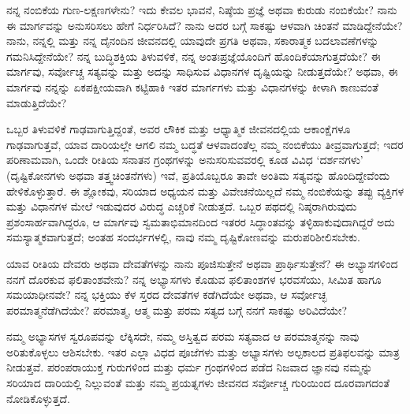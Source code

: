 \begin{mananam}{}
\nfntmtxt ನನ್ನ ನಂಬಿಕೆಯ ಗುಣ-ಲಕ್ಷಣಗಳೇನು? ಇದು ಕೇವಲ ಭಾವನೆ, ನಿಷ್ಠೆಯ ಪ್ರಜ್ಞೆ ಅಥವಾ ಕುರುಡು ನಂಬಿಕೆಯೇ?  ನಾನು ಈ ಮಾರ್ಗವನ್ನು  ಅನುಸರಿಸಲು  ಹೇಗೆ ನಿರ್ಧರಿಸಿದೆ? ನಾನು ಅದರ  ಬಗ್ಗೆ ಸಾಕಷ್ಟು ಆಳವಾಗಿ ಚಿಂತನೆ ಮಾಡಿದ್ದೇನೆಯೇ?  ನಾನು, ನನ್ನಲ್ಲಿ ಮತ್ತು ನನ್ನ ದೈನಂದಿನ ಜೀವನದಲ್ಲಿ ಯಾವುದೇ ಪ್ರಗತಿ ಅಥವಾ, ಸಕಾರಾತ್ಮಕ ಬದಲಾವಣೆಗಳನ್ನು ಗಮನಿಸಿದ್ದೇನೆಯೇ? ನನ್ನ ಬುದ್ಧಿಶಕ್ತಿಯ ತಿಳುವಳಿಕೆ, ನನ್ನ ಅಂತಃಪ್ರಜ್ಞೆಯೊಂದಿಗೆ ಹೊಂದಿಕೆಯಾಗುತ್ತದೆಯೇ? ಈ ಮಾರ್ಗವು, ಸರ್ವೋಚ್ಚ ಸತ್ಯವನ್ನು ಮತ್ತು ಅದನ್ನು ಸಾಧಿಸುವ ವಿಧಾನಗಳ ದೃಷ್ಟಿಯನ್ನು ನೀಡುತ್ತದೆಯೇ? ಅಥವಾ, ಈ ಮಾರ್ಗವು ನನ್ನನ್ನು ಏಕಪಕ್ಷೀಯವಾಗಿ ಕಟ್ಟಿಹಾಕಿ ಇತರ ಮಾರ್ಗಗಳು ಮತ್ತು ವಿಧಾನಗಳನ್ನು ಕೀಳಾಗಿ ಕಾಣುವಂತೆ ಮಾಡುತ್ತಿದೆಯೇ?
\end{mananam}
\sReflect
\begin{inspiration}{}
\nfntmtxt ಒಬ್ಬರ ತಿಳುವಳಿಕೆ ಗಾಢವಾಗುತ್ತಿದ್ದಂತೆ, ಅವರ ಲೌಕಿಕ ಮತ್ತು ಆಧ್ಯಾತ್ಮಿಕ ಜೀವನದಲ್ಲಿಯ ಆಕಾಂಕ್ಷೆಗಳೂ ಗಾಢವಾಗುತ್ತವೆ, ಯಾವ ದಾರಿಯಲ್ಲೇ  ಆಗಲಿ ನಮ್ಮ ಬದ್ಧತೆ ಆಳವಾದಂತೆಲ್ಲ ನಮ್ಮ ನಂಬಿಕೆಯು ತೀವ್ರವಾಗುತ್ತದೆ; ಇದರ ಪರಿಣಾಮವಾಗಿ, ಒಂದೇ ರೀತಿಯ ಸನಾತನ ಗ್ರಂಥಗಳನ್ನು ಅನುಸರಿಸುವವರಲ್ಲಿ ಕೂಡ  ವಿವಿಧ ‘ದರ್ಶನಗಳು’ (ದೃಷ್ಟಿಕೋನಗಳು ಅಥವಾ ತತ್ತ್ವಚಿಂತನೆಗಳು) ಇವೆ, ಪ್ರತಿಯೊಬ್ಬರೂ ತಾವೇ ಅಂತಿಮ ಸತ್ಯವನ್ನು ಹೊಂದಿದ್ದೇವೆಂದು  ಹೇಳಿಕೊಳ್ಳುತ್ತಾರೆ. ಈ ಶ್ಲೋಕವು, ಸರಿಯಾದ ಅಧ್ಯಯನ ಮತ್ತು ವಿವೇಚನೆಯಿಲ್ಲದೆ ನಮ್ಮ ನಂಬಿಕೆಯನ್ನು ತಪ್ಪು ವ್ಯಕ್ತಿಗಳ ಮತ್ತು ವಿಧಾನಗಳ ಮೇಲೆ ಇಡುವುದರ ವಿರುದ್ಧ ಎಚ್ಚರಿಕೆ ನೀಡುತ್ತದೆ. ಒಬ್ಬರ ಪಥದಲ್ಲಿ ನಿಷ್ಠರಾಗಿರುವುದು ಪ್ರಶಂಸಾರ್ಹವಾಗಿದ್ದರೂ, ಆ ಮಾರ್ಗವು ಸ್ವಮತಾಭಿಮಾನದಿಂದ ಇತರರ ಸಿದ್ಧಾಂತವನ್ನು ತಳ್ಳಿಹಾಕುವುದಾಗಿದ್ದರೆ ಅದು ಸಮಸ್ಯಾತ್ಮಕವಾಗುತ್ತದೆ; ಅಂತಹ ಸಂದರ್ಭಗಳಲ್ಲಿ, ನಾವು ನಮ್ಮ ದೃಷ್ಟಿಕೋಣವನ್ನು ಮರುಪರಿಶೀಲಿಸಬೇಕು.
\end{inspiration}
\newpage

\begin{mananam}{}
\nfntmtxt ಯಾವ ರೀತಿಯ ದೇವರು ಅಥವಾ ದೇವತೆಗಳನ್ನು ನಾನು ಪೂಜಿಸುತ್ತೇನೆ ಅಥವಾ ಪ್ರಾರ್ಥಿಸುತ್ತೇನೆ? ಈ ಅಭ್ಯಾಸಗಳಿಂದ ನನಗೆ ದೊರಕುವ ಫಲಿತಾಂಶವೇನು? ನನ್ನ ಅಭ್ಯಾಸಗಳು ಕೊಡುವ ಫಲಿತಾಂಶಗಳ ಭರವಸೆಯು, ಸೀಮಿತ ಹಾಗೂ ಸಮಯಾಧೀನವೇ? ನನ್ನ ಭಕ್ತಿಯು ಕೆಳ ಸ್ತರದ ದೇವತೆಗಳ ಕಡೆಗಿದೆಯೇ ಅಥವಾ, ಆ ಸರ್ವೋಚ್ಛ ಪರಮಾತ್ಮನೆಡೆಗಿದೆಯೇ? ಪರಮಾತ್ಮ, ಆತ್ಮ ಮತ್ತು ಪರಮ ಸತ್ಯದ ಬಗ್ಗೆ ನನಗೆ ಸಾಕಷ್ಟು ಅರಿವಿದೆಯೇ?
\end{mananam}
\sReflect
\begin{inspiration}{}
\nfntmtxt ನಮ್ಮ ಅಭ್ಯಾಸಗಳ ಸ್ವರೂಪವನ್ನು ಲೆಕ್ಕಿಸದೇ, ನಮ್ಮ ಅಸ್ತಿತ್ವದ ಪರಮ ಸತ್ಯವಾದ ಆ ಪರಮಾತ್ಮನನ್ನು ನಾವು  ಅರಿತುಕೊಳ್ಳಲು ಆಶಿಸಬೇಕು. ಇತರ ಎಲ್ಲಾ ವಿಧದ ಪೂಜೆಗಳು ಮತ್ತು ಅಭ್ಯಾಸಗಳು ಅಲ್ಪಕಾಲದ ಪ್ರತಿಫಲವನ್ನು ಮಾತ್ರ ನೀಡುತ್ತವೆ.
ಪರಂಪರಾಯುಕ್ತ ಗುರುಗಳಿಂದ ಮತ್ತು ಧರ್ಮ ಗ್ರಂಥಗಳಿಂದ ಪಡೆದ ನಿಜವಾದ ಜ್ಞಾನವು ನಮ್ಮನ್ನು ಸರಿಯಾದ ದಾರಿಯಲ್ಲಿ ನಿಲ್ಲುವಂತೆ ಮತ್ತು ನಮ್ಮ ಪ್ರಯತ್ನಗಳು ಜೀವನದ ಸರ್ವೋಚ್ಚ ಗುರಿಯಿಂದ ದೂರವಾಗದಂತೆ ನೋಡಿಕೊಳ್ಳುತ್ತದೆ. 
\end{inspiration}
\newpage


